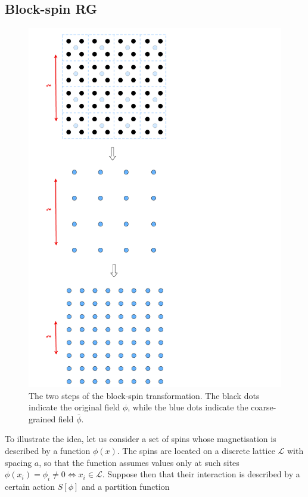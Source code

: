 \subsection{Block-spin RG}
\label{sec:blockspin}
\begin{figure}
    \centering 
    \includegraphics[angle=90,scale=0.34]{figures/blockspin.pdf}
    \caption[Block-spin transformation]{The two steps of the block-spin transformation. The black dots indicate the original field $\phi$, while the blue dots indicate the coarse-grained field $\bar \phi$.}
    \label{fig:blockin_first}
\end{figure}
To illustrate the idea, let us consider a set of spins whose magnetisation is described by a function $\phi(x)$. The spins are located on a discrete lattice $\mathscr{L}$ with spacing $a$, so that the function assumes values only at such sites $\phi(x_i) = \phi_i \neq 0 \Leftrightarrow x_i \in \mathscr{L}$. Suppose then that their interaction is described by a certain action $S[\phi]$ and a partition function
